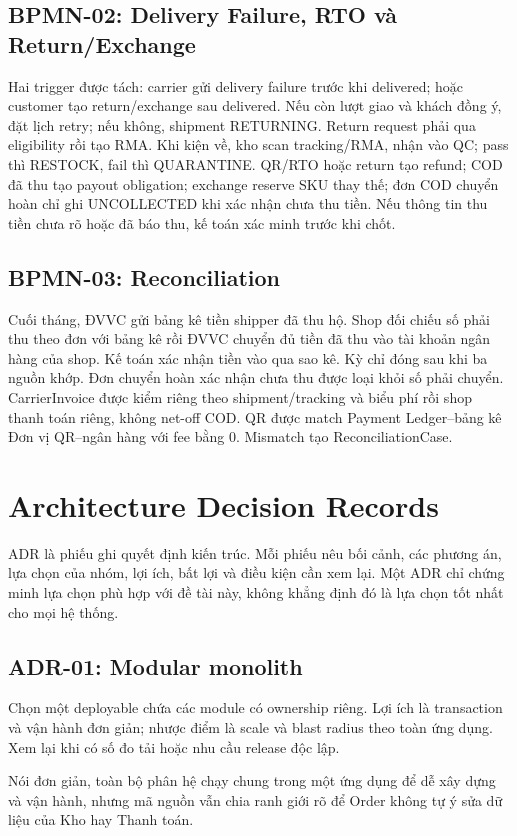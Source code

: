 \documentclass[12pt,a4paper]{report}
\begin{document}
\section{BPMN-02: Delivery Failure, RTO và Return/Exchange}
Hai trigger được tách: carrier gửi delivery failure trước khi delivered; hoặc customer tạo return/exchange sau delivered. Nếu còn lượt giao và khách đồng ý, đặt lịch retry; nếu không, shipment RETURNING. Return request phải qua eligibility rồi tạo RMA. Khi kiện về, kho scan tracking/RMA, nhận vào QC; pass thì RESTOCK, fail thì QUARANTINE. QR/RTO hoặc return tạo refund; COD đã thu tạo payout obligation; exchange reserve SKU thay thế; đơn COD chuyển hoàn chỉ ghi UNCOLLECTED khi xác nhận chưa thu tiền. Nếu thông tin thu tiền chưa rõ hoặc đã báo thu, kế toán xác minh trước khi chốt.

\section{BPMN-03: Reconciliation}
Cuối tháng, ĐVVC gửi bảng kê tiền shipper đã thu hộ. Shop đối chiếu số phải thu theo đơn với bảng kê rồi ĐVVC chuyển đủ tiền đã thu vào tài khoản ngân hàng của shop. Kế toán xác nhận tiền vào qua sao kê. Kỳ chỉ đóng sau khi ba nguồn khớp. Đơn chuyển hoàn xác nhận chưa thu được loại khỏi số phải chuyển. CarrierInvoice được kiểm riêng theo shipment/tracking và biểu phí rồi shop thanh toán riêng, không net-off COD. QR được match Payment Ledger--bảng kê Đơn vị QR--ngân hàng với fee bằng 0. Mismatch tạo ReconciliationCase.

\chapter{Architecture Decision Records}

ADR là phiếu ghi quyết định kiến trúc. Mỗi phiếu nêu bối cảnh, các phương án, lựa chọn của nhóm, lợi ích, bất lợi và điều kiện cần xem lại. Một ADR chỉ chứng minh lựa chọn phù hợp với đề tài này, không khẳng định đó là lựa chọn tốt nhất cho mọi hệ thống.

\section{ADR-01: Modular monolith}
Chọn một deployable chứa các module có ownership riêng. Lợi ích là transaction và vận hành đơn giản; nhược điểm là scale và blast radius theo toàn ứng dụng. Xem lại khi có số đo tải hoặc nhu cầu release độc lập.

Nói đơn giản, toàn bộ phân hệ chạy chung trong một ứng dụng để dễ xây dựng và vận hành, nhưng mã nguồn vẫn chia ranh giới rõ để Order không tự ý sửa dữ liệu của Kho hay Thanh toán.
\end{document}
